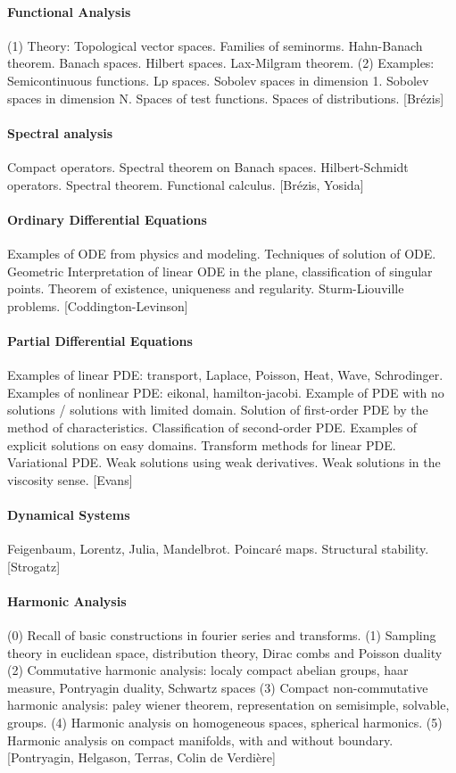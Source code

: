 \paragraph{Functional Analysis}
(1) Theory:
Topological vector spaces.  Families of seminorms.  Hahn-Banach theorem.
Banach spaces.
Hilbert spaces.  Lax-Milgram theorem.
(2) Examples:
Semicontinuous functions.
Lp spaces.
Sobolev spaces in dimension 1.
Sobolev spaces in dimension N.
Spaces of test functions.
Spaces of distributions.
[Brézis]

\paragraph{Spectral analysis}
Compact operators.
Spectral theorem on Banach spaces.
Hilbert-Schmidt operators.
Spectral theorem.  Functional calculus.
[Brézis, Yosida]

\paragraph{Ordinary Differential Equations}
Examples of ODE from physics and modeling.
Techniques of solution of ODE.
Geometric Interpretation of linear ODE in the plane, classification of
singular points.
Theorem of existence, uniqueness and regularity.
Sturm-Liouville problems.
[Coddington-Levinson]

\paragraph{Partial Differential Equations}
Examples of linear PDE: transport, Laplace, Poisson, Heat, Wave, Schrodinger.
Examples of nonlinear PDE: eikonal, hamilton-jacobi.
Example of PDE with no solutions / solutions with limited domain.
Solution of first-order PDE by the method of characteristics.
Classification of second-order PDE.  Examples of explicit solutions on easy
domains.
Transform methods for linear PDE.
Variational PDE.
Weak solutions using weak derivatives.
Weak solutions in the viscosity sense.
[Evans]

\paragraph{Dynamical Systems}
Feigenbaum, Lorentz, Julia, Mandelbrot.
Poincaré maps.  Structural stability.
[Strogatz]

\paragraph{Harmonic Analysis}
(0) Recall of basic constructions in fourier series and transforms.
(1) Sampling theory in euclidean space, distribution theory, Dirac combs and
Poisson duality
(2) Commutative harmonic analysis: localy compact abelian groups, haar
measure, Pontryagin duality, Schwartz spaces
(3) Compact non-commutative harmonic analysis: paley wiener theorem,
representation on semisimple, solvable, groups.
(4) Harmonic analysis on homogeneous spaces, spherical harmonics.
(5) Harmonic analysis on compact manifolds, with and without boundary.
[Pontryagin, Helgason, Terras, Colin de Verdière]

